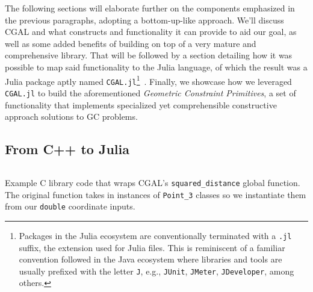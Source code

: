 The following sections will elaborate further on the components emphasized in
the previous paragraphs, adopting a bottom-up-like approach.  We'll discuss
\ac{CGAL} and what constructs and functionality it can provide to aid our goal,
as well as some added benefits of building on top of a very mature and
comprehensive library.  That will be followed by a section detailing how it was
possible to map said functionality to the Julia language, of which the result
was a Julia package aptly named \texttt{CGAL.jl}\footnote{Packages in the Julia
ecosystem are conventionally terminated with a \texttt{.jl} suffix, the
extension used for Julia files.  This is reminiscent of a familiar convention
followed in the Java ecosystem where libraries and tools are usually prefixed
with the letter \texttt{J}, e.g., \texttt{JUnit}, \texttt{JMeter},
\texttt{JDeveloper}, among others.}~\cite{Ventura:2019:CGAL.jl}.  Finally, we
showcase how we leveraged \texttt{CGAL.jl} to build the aforementioned
\textit{Geometric Constraint Primitives}, a set of functionality that implements
specialized yet comprehensible constructive approach solutions to \ac{GC}
problems.



\subsection{From C++ to Julia}%
\label{sec:solution.impl.jlcgal}

\begin{listing}[htb]
  \inputminted{cpp}{cpp/sqdist.cpp}
  \caption[C wrapper for squared distance functionality]{
    Example C library code that wraps \ac{CGAL}'s \texttt{squared\_distance}
    global function.  The original function takes in instances of
    \texttt{Point\_3} classes so we instantiate them from our \texttt{double}
    coordinate inputs.}%
  \label{lst:solution.impl.jlcgal.sqdist.cpp}
\end{listing}

